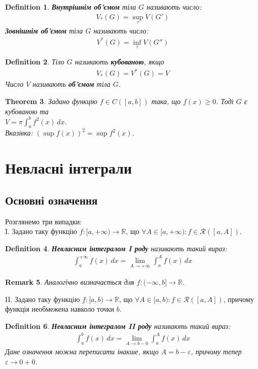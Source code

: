 \documentclass[a4paper, 10pt]{article}
\def\huge{\displaystyle}
\theoremstyle{theoremdd}
\newtheorem{theorem}{Theorem}[subsection]
\theoremstyle{theoremdd}
\newtheorem{definition}[theorem]{Definition}
\theoremstyle{theoremdd}
\theoremstyle{theoremdd}
\theoremstyle{theoremdd}
\theoremstyle{theoremdd}
\newtheorem{remark}[theorem]{Remark}
\theoremstyle{theoremdd}
\theoremstyle{theoremdd}
\begin{document}
\begin{definition}
\textbf{Внутрішнім об'ємом} тіла $G$ називають число:
\begin{align*}
V_*(G) = \huge\sup_{\tau} V(G')
\end{align*}
\textbf{Зовнішнім об'ємом} тіла $G$ називають число:
\begin{align*}
V^*(G) = \huge\inf_{\tau} V(G'')
\end{align*}
\end{definition}

\begin{definition}
Тіло $G$ називають \textbf{кубованою}, якщо
\begin{align*}
V_*(G) = V^*(G) = V
\end{align*}
Число $V$ називають \textbf{об'ємом} тіла $G$.
\end{definition}

\begin{theorem}
Задано функцію $f \in C([a,b])$ така, що $f(x) \geq 0$. Тоді $G$ є кубованою та \\ $V = \pi \huge\int_a^b f^2(x)\,dx$.\\
\textit{Вказівка: $\huge (\sup f(x))^2 = \sup f^2 (x)$.}
\end{theorem}
\newpage
\fi


\iffalse
\section{Невласні інтеграли}
\subsection{Основні означення}
Розглянемо три випадки:\\
I. Задано таку функцію $f: [a,+\infty) \to \mathbb{R}$, що $\forall A \in [a,+\infty): f \in \mathcal{R}([a,A])$.
\begin{definition}
\textbf{Невласним інтегралом I роду} називають такий вираз:
\begin{align*}
\int_a^{+\infty} f(x)\,dx = \lim_{A \to +\infty} \int_a^A f(x)\,dx
\end{align*}
\end{definition}

\begin{remark}
Аналогічно визначається для $f: (-\infty,b] \to \mathbb{R}$.
\end{remark}

II. Задано таку функцію $f: [a,b) \to \mathbb{R}$, що $\forall A \in [a,b): f \in \mathcal{R}([a,A])$, причому функція необмежена навколо точки $b$.
\begin{definition}
\textbf{Невласним інтегралом II роду} називають такий вираз:
\begin{align*}
\int_a^b f(x)\,dx = \lim_{A \to b-0} \int_a^{A} f(x)\,dx
\end{align*}
Дане означення можна переписати інакше, якщо $A = b-\varepsilon$, причому тепер $\varepsilon \to 0+0$.
\end{definition}
\end{document}
